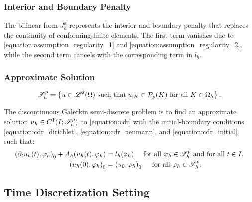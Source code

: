 \newpage
\subsubsection{Interior and Boundary Penalty}

The bilinear form $J^{\kappa}_h$ represents the interior and boundary penalty that replaces the continuity of conforming finite elements. The first term vanishes due to \eqref{equation:assumption_regularity_1} and \eqref{equation:assumption_regularity_2}, while the second term cancels with the corresponding term in $l_h$.

\subsubsection{Approximate Solution}

\begin{definition}[$\SpaceSolution_h^p$]
    \begin{gather}
        \mathscr{S}_h^p = \left\{ u \in \mathscr{L}^{2}(\Omega) \text{ such that } u_{\mid K} \in \mathcal{P}_{p}(K) \text{ for all } K \in \Omega_h \right\}.
    \end{gather}
\end{definition}

The discontinuous Galërkin semi-discrete problem is to find an approximate solution $u_h \in C^1(I; \mathscr{S}_h^p)$ to \eqref{equation:cdr} with the initial-boundary conditions \eqref{equation:cdr_dirichlet}, \eqref{equation:cdr_neumann}, and \eqref{equation:cdr_initial}, such that:
\begin{align}
    \left( \partial_t u_h(t), \varphi_h \right)_0 + A_h(u_h(t), \varphi_h) &= l_h(\varphi_h) \quad \text{ for all } \varphi_h \in \mathscr{S}_h^p \text{ and for all } t \in I, \\
    \left( u_h(0), \varphi_h \right)_0 &= \left( u_0, \varphi_h \right)_0 \quad \text{ for all } \varphi_h \in \mathscr{S}_h^p.
\end{align}

\newpage
\subsection{Time Discretization Setting}

